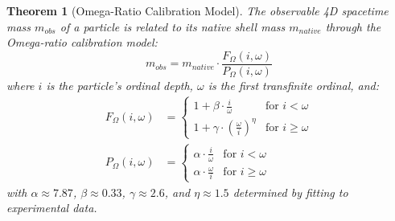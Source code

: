 \documentclass[12pt,a4paper]{article}
\newtheorem{theorem}{Theorem}[section]
\begin{document}
\begin{theorem}[Omega-Ratio Calibration Model]
\label{thm:omega-ratio-calibration}
The observable 4D spacetime mass $m_{obs}$ of a particle is related to its native shell mass $m_{native}$ through the Omega-ratio calibration model:
\begin{equation}
m_{obs} = m_{native} \cdot \frac{F_{\Omega}(i, \omega)}{P_{\Omega}(i, \omega)}
\end{equation}
where $i$ is the particle's ordinal depth, $\omega$ is the first transfinite ordinal, and:
\begin{align}
F_{\Omega}(i, \omega) &= 
\begin{cases}
1 + \beta \cdot \frac{i}{\omega} & \text{for } i < \omega \\
1 + \gamma \cdot \left(\frac{\omega}{i}\right)^{\eta} & \text{for } i \geq \omega
\end{cases} \\
P_{\Omega}(i, \omega) &= 
\begin{cases}
\alpha \cdot \frac{i}{\omega} & \text{for } i < \omega \\
\alpha \cdot \frac{\omega}{i} & \text{for } i \geq \omega
\end{cases}
\end{align}
with $\alpha \approx 7.87$, $\beta \approx 0.33$, $\gamma \approx 2.6$, and $\eta \approx 1.5$ determined by fitting to experimental data.
\end{theorem}
\end{document}
